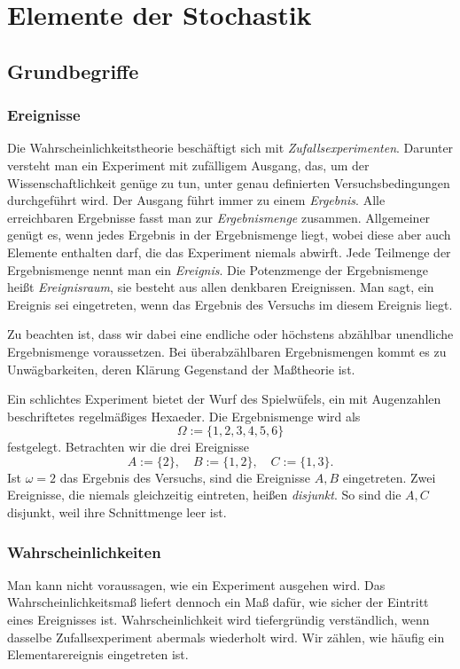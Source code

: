 
\chapter{Elemente der Stochastik}

\section{Grundbegriffe}

\subsection{Ereignisse}

Die Wahrscheinlichkeitstheorie beschäftigt sich mit
\emph{Zufallsexperimenten}. Darunter versteht man ein Experiment
mit zufälligem Ausgang, das, um der Wissenschaftlichkeit genüge zu tun,
unter genau definierten Versuchsbedingungen durchgeführt wird.
Der Ausgang führt immer zu einem \emph{Ergebnis}. Alle erreichbaren
Ergebnisse fasst man zur \emph{Ergebnismenge} zusammen. Allgemeiner
genügt es, wenn jedes Ergebnis in der Ergebnismenge liegt, wobei diese
aber auch Elemente enthalten darf, die das Experiment niemals abwirft.
Jede Teilmenge der Ergebnismenge nennt man ein \emph{Ereignis}.
Die Potenzmenge der Ergebnismenge heißt \emph{Ereignisraum}, sie
besteht aus allen denkbaren Ereignissen. Man sagt, ein Ereignis sei
eingetreten, wenn das Ergebnis des Versuchs im diesem Ereignis liegt.

Zu beachten ist, dass wir dabei eine endliche oder höchstens
abzählbar unendliche Ergebnismenge voraussetzen. Bei überabzählbaren
Ergebnismengen kommt es zu Unwägbarkeiten, deren Klärung Gegenstand der
Maßtheorie ist.

Ein schlichtes Experiment bietet der Wurf des Spielwüfels, ein mit
Augenzahlen beschriftetes regelmäßiges Hexaeder. Die Ergebnismenge
wird als
\[\Omega := \{1, 2, 3, 4, 5, 6\}\]
festgelegt. Betrachten wir die drei Ereignisse
\[A := \{2\},\quad B := \{1,2\},\quad C:=\{1,3\}.\]
Ist $\omega=2$ das Ergebnis des Versuchs, sind die Ereignisse $A,B$
eingetreten. Zwei Ereignisse, die niemals gleichzeitig eintreten,
heißen \emph{disjunkt}. So sind die $A,C$ disjunkt, weil ihre
Schnittmenge leer ist.

\subsection{Wahrscheinlichkeiten}

Man kann nicht voraussagen, wie ein Experiment ausgehen wird. Das
Wahrscheinlichkeitsmaß liefert dennoch ein Maß dafür, wie sicher der
Eintritt eines Ereignisses ist. Wahrscheinlichkeit wird tiefergründig
verständlich, wenn dasselbe Zufallsexperiment abermals wiederholt wird.
Wir zählen, wie häufig ein Elementarereignis eingetreten ist.

